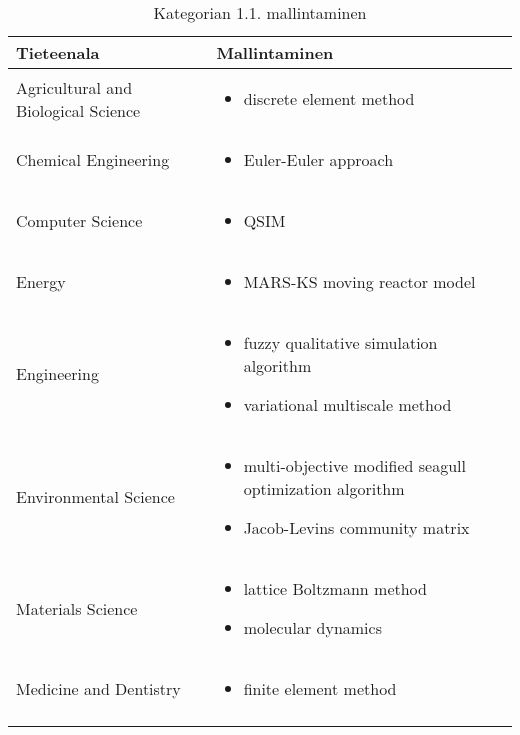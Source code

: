 \documentclass[utf8]{gradu3}
\begin{document}
\begin{longtable}[h]{|p{5cm}|p{8cm}|}
    \hline
    \textbf{Tieteenala}    &    \textbf{Mallintaminen}\\
    \hline
    Agricultural and Biological Science & \begin{itemize}
        \item discrete element method
    \end{itemize} \\
    \hline
    Chemical Engineering & \begin{itemize}
        \item Euler-Euler approach
    \end{itemize} \\
    \hline
    Computer Science & \begin{itemize}
        \item QSIM
    \end{itemize} \\
    \hline
    Energy & \begin{itemize}
        \item MARS-KS moving reactor model
    \end{itemize} \\
    \hline
    Engineering & \begin{itemize}
        \item fuzzy qualitative simulation algorithm
        \item variational multiscale method
    \end{itemize} \\
    \hline
    Environmental Science & \begin{itemize}
        \item multi-objective modified seagull optimization algorithm
        \item Jacob-Levins community matrix
    \end{itemize} \\
    \hline
    Materials Science & \begin{itemize}
        \item lattice Boltzmann method
        \item molecular dynamics
    \end{itemize} \\
    \hline
    Medicine and Dentistry & \begin{itemize}
        \item finite element method
    \end{itemize} \\
    \hline
    \caption{Kategorian 1.1. mallintaminen}
    \label{table:Kategorian 1.1. mallintaminen}
\end{longtable}
\end{document}
